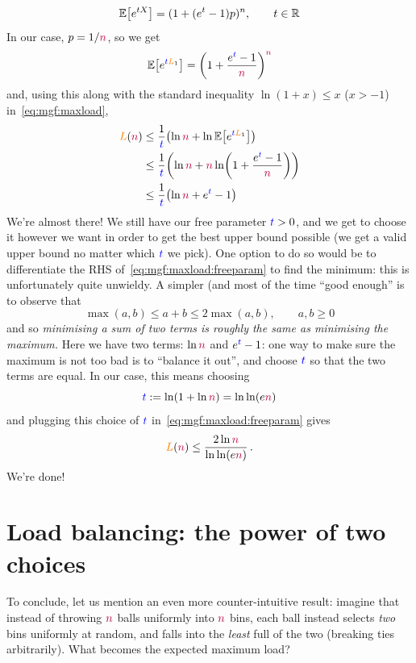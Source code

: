 \begin{equation}
    \expect{e^{tX}} = (1+(e^t-1)p)^n, \qquad t\in\R
\end{equation}
In our case, $p = 1/\textcolor{purple}{n}$, so we get
\[
    \expect{e^{\blue{t}\orange{L}_1}} 
    = \Paren{1+\frac{e^{\blue{t}}-1}{\nbins}}^{\nbins}
\]
and, using this along with the standard inequality $\ln(1+x) \leq x$ ($x> -1$) in~\eqref{eq:mgf:maxload},
\begin{align}
    \orange{L}(\nbins) 
    &\leq \frac{1}{\blue{t}}\Paren{ \ln \nbins + \ln\expect{e^{\blue{t}\orange{L}_1}} } \notag\\
    &\leq \frac{1}{\blue{t}}\Paren{ \ln \nbins + \nbins\ln\Paren{1+\frac{e^{\blue{t}}-1}{\nbins}} } \notag\\
    &\leq \frac{1}{\blue{t}}\Paren{ \ln \nbins + e^{\blue{t}}-1 } \label{eq:mgf:maxload:freeparam}
\end{align}
We're almost there! We still have our free parameter $\textcolor{blue}{t}>0$, and we get to choose it however we want in order to get the best upper bound possible (we get a valid upper bound no matter which $\textcolor{blue}{t}$ we pick). One option to do so would be to differentiate the RHS of~\eqref{eq:mgf:maxload:freeparam} to find the minimum: this is unfortunately quite unwieldy. A simpler (and most of the time ``good enough'' is to observe that
\begin{equation}
\max(a,b) \leq a+b \leq 2\max(a,b), \qquad a,b\geq 0
\end{equation}
and so \emph{minimising a sum of two terms is roughly the same as minimising the maximum.} Here we have two terms: $\ln \textcolor{purple}{n}$ and $e^{\textcolor{blue}{t}}-1$: one way to make sure the maximum is not too bad is to ``balance it out'', and choose $\textcolor{blue}{t}$ so that the two terms are equal. In our case, this means choosing
\begin{equation}
\blue{t} \eqdef \ln\Paren{1+\ln \nbins} = \ln\ln(e\nbins)
\end{equation}
and plugging this choice of $\textcolor{blue}{t}$ in~\eqref{eq:mgf:maxload:freeparam} gives
\begin{equation}
    \label{eq:mgf:maxload:end}
    \textcolor{orange}{L}(\textcolor{purple}{n})
    \leq \frac{2\ln \textcolor{purple}{n}}{\ln\ln(e\textcolor{purple}{n})}\,.
\end{equation}
We're done!


\section{Load balancing: the power of two choices}
To conclude, let us mention an even more counter-intuitive result: imagine that instead of throwing $\textcolor{purple}{n}$ balls uniformly into $\textcolor{purple}{n}$ bins, each ball instead selects \emph{two} bins uniformly at random, and falls into the \emph{least} full of the two (breaking ties arbitrarily). What becomes the expected maximum load?

